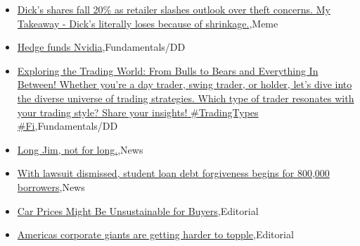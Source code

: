 \documentclass{article}%
\begin{document}
%
\begin{itemize}%
\item%
\href{https://reddit.com/r/wallstreetbets/comments/15y40kt/dicks\_shares\_fall\_20\_as\_retailer\_slashes\_outlook/}{Dick's shares fall 20\% as retailer slashes outlook over theft concerns. My Takeaway - Dick's literally loses because of shrinkage.},Meme%
\item%
\href{https://reddit.com/r/StockMarket/comments/15y4nx1/hedge\_funds\_nvidia/}{Hedge funds  Nvidia},Fundamentals/DD%
\item%
\href{https://reddit.com/r/StockMarket/comments/15y2k0j/exploring\_the\_trading\_world\_from\_bulls\_to\_bears/}{ Exploring the Trading World: From Bulls to Bears and Everything In Between!  Whether you're a day trader, swing trader, or holder, let's dive into the diverse universe of trading strategies. Which type of trader resonates with your trading style? Share your insights!  \#TradingTypes \#Fi},Fundamentals/DD%
\item%
\href{https://reddit.com/r/StockMarket/comments/15xnrqg/long\_jim\_not\_for\_long/}{Long Jim, not for long.},News%
\item%
\href{https://reddit.com/r/Economics/comments/15xzyjs/with\_lawsuit\_dismissed\_student\_loan\_debt/}{With lawsuit dismissed, student loan debt forgiveness begins for 800,000 borrowers},News%
\item%
\href{https://reddit.com/r/Economics/comments/15xwu8k/car\_prices\_might\_be\_unsustainable\_for\_buyers/}{Car Prices Might Be Unsustainable for Buyers},Editorial%
\item%
\href{https://reddit.com/r/Economics/comments/15xre5b/americas\_corporate\_giants\_are\_getting\_harder\_to/}{Americas corporate giants are getting harder to topple},Editorial%
\end{itemize}%
\end{document}
